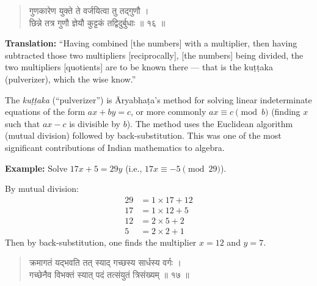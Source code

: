 \documentclass[11pt,a4paper]{article}
\newcommand{\dev}[1]{{\devanagarifont #1}}
\newenvironment{sanskritverse}{\begin{verse}\devanagarifont\large\centering}{\end{verse}}
\begin{document}
\vspace{0.5cm}

\begin{tcolorbox}[colback=gray!10,colframe=titlecolor,title={\dev{\textbf{गणित १६ — कुट्टकः (The Pulverizer) — FAMOUS VERSE}}}]
\begin{sanskritverse}
\dev{गुणकारेण युक्ते ते वर्जयित्वा तु तद्गुणौ ।\\
छिन्ने तत्र गुणौ ज्ञेयौ कुट्टकं तद्विदुर्बुधाः ॥ १६ ॥}
\end{sanskritverse}
\end{tcolorbox}

\vspace{0.3cm}
\noindent\textbf{Translation:} ``Having combined [the numbers] with a multiplier, then having subtracted those two multipliers [reciprocally], [the numbers] being divided, the two multipliers [quotients] are to be known there --- that is the kuṭṭaka (pulverizer), which the wise know.''

\smallskip
\noindent The \textit{kuṭṭaka} (``pulverizer'') is Āryabhaṭa's method for solving linear indeterminate equations of the form $ax + by = c$, or more commonly $ax \equiv c \pmod{b}$ (finding $x$ such that $ax - c$ is divisible by $b$). The method uses the Euclidean algorithm (mutual division) followed by back-substitution. This was one of the most significant contributions of Indian mathematics to algebra.

\smallskip
\noindent\textbf{Example:} Solve $17x + 5 = 29y$ (i.e., $17x \equiv -5 \pmod{29}$).

By mutual division:
\begin{align*}
29 &= 1 \times 17 + 12 \\
17 &= 1 \times 12 + 5 \\
12 &= 2 \times 5 + 2 \\
5 &= 2 \times 2 + 1
\end{align*}
Then by back-substitution, one finds the multiplier $x = 12$ and $y = 7$.

\vspace{0.5cm}

\begin{tcolorbox}[colback=white,colframe=rulecolor,title={\dev{\textbf{गणित १७ — क्रमागतिः (Series / Progressions)}}}]
\begin{sanskritverse}
\dev{क्रमागतं यद्‌भवति तत् स्याद् गच्छस्य सार्धस्य वर्गः ।\\
गच्छेनैव विभक्तं स्यात् पदं तत्संयुतं त्रिसंख्यम् ॥ १७ ॥}
\end{sanskritverse}
\end{tcolorbox}
\end{document}
